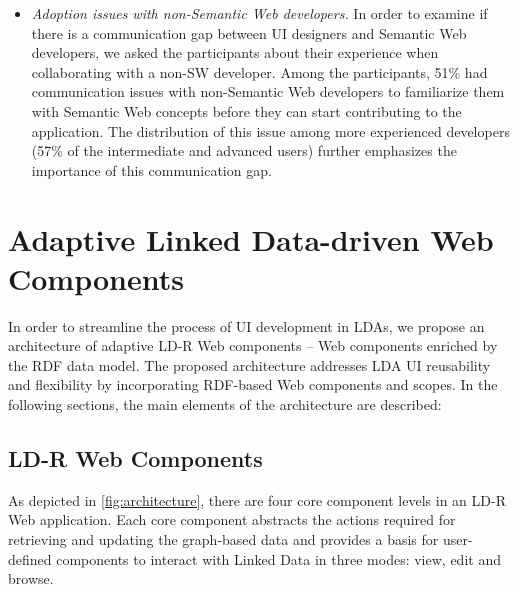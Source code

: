 \documentclass{llncs}
\begin{document}
\begin{itemize}
\item
\emph{Adoption issues with non-Semantic Web developers.}
In order to examine if there is a communication gap between UI designers and Semantic Web developers, we asked the participants about their experience when collaborating with a non-SW developer.
Among the participants, 51\% had communication issues with non-Semantic Web developers to familiarize them with Semantic Web concepts before they can start contributing to the application.
The distribution of this issue among more experienced developers (57\% of the intermediate and advanced users) further emphasizes the importance of this communication gap.

\end{itemize}

\section{Adaptive Linked Data-driven Web Components}
In order to streamline the process of UI development in LDAs, we propose an architecture of adaptive LD-R Web components -- Web components enriched by the RDF data model.
The proposed architecture addresses LDA UI reusability and flexibility by incorporating RDF-based Web components and scopes.
In the following sections, the main elements of the architecture are described:

\subsection{LD-R Web Components}
As depicted in \autoref{fig:architecture}, there are four core component levels in an LD-R Web application.
Each core component abstracts the actions required for retrieving and updating the graph-based data and provides a basis for user-defined components to interact with Linked Data in three modes: view, edit and browse.

\end{document}

